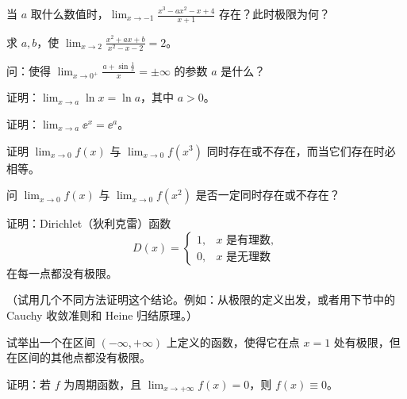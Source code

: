 \begin{xexercise}[4]
当 $a$ 取什么数值时，$\displaystyle\lim_{x\to-1}\frac{x^3-ax^2-x+4}{x+1}$ 存在？此时极限为何？
\end{xexercise}

\begin{xexercise}[5]
求 $a,b$，使 $\displaystyle\lim_{x\to2}\frac{x^2+ax+b}{x^2-x-2}=2$。
\end{xexercise}

\begin{xexercise}[6]
问：使得 $\displaystyle\lim_{x\to0^+}\frac{a+\sin\frac1x}{x}=\pm\infty$ 的参数 $a$ 是什么？
\end{xexercise}

\begin{xexercise}[7]
证明：$\displaystyle\lim_{x\to a}\ln x=\ln a$，其中 $a>0$。
\end{xexercise}

\begin{xexercise}[8]
证明：$\displaystyle\lim_{x\to a}\ee^x=\ee^a$。
\end{xexercise}

\begin{xexercise}[9]
证明 $\displaystyle\lim_{x\to0}f(x)$ 与 $\displaystyle\lim_{x\to0}f(x^3)$ 同时存在或不存在，而当它们存在时必相等。
\end{xexercise}

\begin{xexercise}[10]
问 $\displaystyle\lim_{x\to0}f(x)$ 与 $\displaystyle\lim_{x\to0}f(x^2)$ 是否一定同时存在或不存在？
\end{xexercise}

\begin{xexercise}[11]
证明：Dirichlet（狄利克雷）函数
  \[
    D(x)=\begin{cases}
      1,&x\text{ 是有理数},\\
      0,&x\text{ 是无理数}
    \end{cases}
  \]
  在每一点都没有极限。

  （试用几个不同方法证明这个结论。例如：从极限的定义出发，或者用下节中的 Cauchy 收敛准则和 Heine 归结原理。）
\end{xexercise}

\begin{xexercise}[12]
试举出一个在区间 $(-\infty,+\infty)$ 上定义的函数，使得它在点 $x=1$ 处有极限，但在区间的其他点都没有极限。
\end{xexercise}

\begin{xexercise}[13]
证明：若 $f$ 为周期函数，且 $\lim_{x\to+\infty}f(x)=0$，则 $f(x)\equiv0$。
\end{xexercise}

